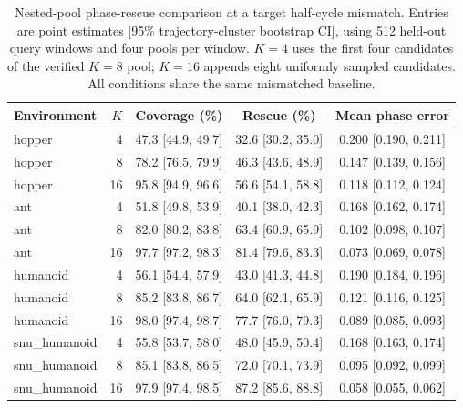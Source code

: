 \begin{table}[H]
\centering\small
\begin{tabular}{lrccc}
\toprule
Environment & $K$ & Coverage (\%) & Rescue (\%) & Mean phase error \\
\midrule
hopper & 4 & 47.3 [44.9, 49.7] & 32.6 [30.2, 35.0] & 0.200 [0.190, 0.211] \\
hopper & 8 & 78.2 [76.5, 79.9] & 46.3 [43.6, 48.9] & 0.147 [0.139, 0.156] \\
hopper & 16 & 95.8 [94.9, 96.6] & 56.6 [54.1, 58.8] & 0.118 [0.112, 0.124] \\
ant & 4 & 51.8 [49.8, 53.9] & 40.1 [38.0, 42.3] & 0.168 [0.162, 0.174] \\
ant & 8 & 82.0 [80.2, 83.8] & 63.4 [60.9, 65.9] & 0.102 [0.098, 0.107] \\
ant & 16 & 97.7 [97.2, 98.3] & 81.4 [79.6, 83.3] & 0.073 [0.069, 0.078] \\
humanoid & 4 & 56.1 [54.4, 57.9] & 43.0 [41.3, 44.8] & 0.190 [0.184, 0.196] \\
humanoid & 8 & 85.2 [83.8, 86.7] & 64.0 [62.1, 65.9] & 0.121 [0.116, 0.125] \\
humanoid & 16 & 98.0 [97.4, 98.7] & 77.7 [76.0, 79.3] & 0.089 [0.085, 0.093] \\
snu\_humanoid & 4 & 55.8 [53.7, 58.0] & 48.0 [45.9, 50.4] & 0.168 [0.163, 0.174] \\
snu\_humanoid & 8 & 85.1 [83.8, 86.5] & 72.0 [70.1, 73.9] & 0.095 [0.092, 0.099] \\
snu\_humanoid & 16 & 97.9 [97.4, 98.5] & 87.2 [85.6, 88.8] & 0.058 [0.055, 0.062] \\
\bottomrule
\end{tabular}
\caption{Nested-pool phase-rescue comparison at a target half-cycle mismatch. Entries are point estimates [95\% trajectory-cluster bootstrap CI], using 512 held-out query windows and four pools per window. $K=4$ uses the first four candidates of the verified $K=8$ pool; $K=16$ appends eight uniformly sampled candidates. All conditions share the same mismatched baseline.}
\label{tab:phase_rescue_k_sweep}
\end{table}
